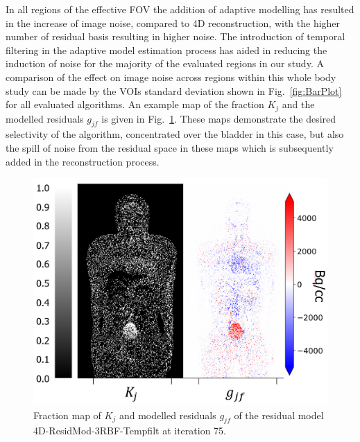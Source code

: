 In all regions of the effective FOV the addition of adaptive modelling has resulted in the increase of image noise, compared to 4D reconstruction, with the higher number of residual basis resulting in higher noise. The introduction of temporal filtering in the adaptive model estimation process has aided in reducing the induction of noise for the majority of the evaluated regions in our study. 
A comparison of the effect on image noise across regions within this whole body study can be made by the VOIs standard deviation shown in Fig.~\ref{fig:BarPlot} for all evaluated algorithms.
An example map of the fraction $K_{j}$ and the modelled residuals $g_{jf}$ is given in Fig.~\ref{fig:FractionMap}. These maps demonstrate the desired selectivity of the algorithm, concentrated over the bladder in this case, but also the
spill of noise from the residual space in these maps which is subsequently added in the reconstruction process.

\begin{figure} [h!]
\centering
\includegraphics[scale=0.44 ,angle=0]{3_Results/3_3_DWB_Reconstruction/MIC2020/FractionMap.png}
\caption{Fraction map of $K_j$ and modelled residuals $g_{jf}$ of the residual model 4D-ResidMod-3RBF-Tempfilt at iteration 75.} 
\label{fig:FractionMap}
\end{figure}

